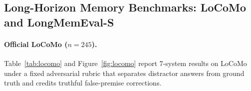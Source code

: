\documentclass[10pt,twocolumn]{article}
\begin{document}
\subsection{Long-Horizon Memory Benchmarks: LoCoMo and LongMemEval-S}

\paragraph{Official LoCoMo ($n=245$).}
Table~\ref{tab:locomo} and Figure~\ref{fig:locomo} report 7-system results on LoCoMo under a fixed adversarial rubric that separates distractor answers from ground truth and credits truthful false-premise corrections.

\begin{table}[t]
\centering
\caption{Official LoCoMo ($n=245$ stratified QAs across 10 conversations / 272 sessions; \texttt{deepseek-chat}, commit \texttt{9d77dcb}). Total USD breaks down query + write-time ingest cost (\texttt{Q+I}); Mem0 ingest USD reflects the pre-v0.2.0 character estimator and default \texttt{top\_k=20} fallback (Section~4). Bold marks best per column; $^*$ denotes $p < 0.05$ by exact paired McNemar test vs.\ Chatree. $\ddagger$Partial checkpoint ($n=117$); McNemar computed over the exact 117-QA intersection.}
\label{tab:locomo}
\small
\setlength{\tabcolsep}{3.0pt}
\end{table}
\end{document}
